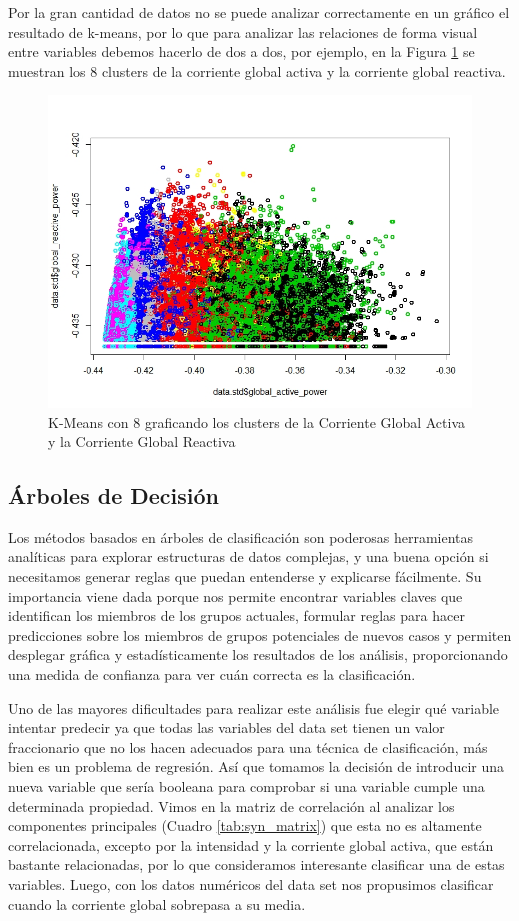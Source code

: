 \documentclass[a4paper,10pt,twocolumn]{report}
\begin{document}
	Por la gran cantidad de datos no se puede analizar correctamente en un gráfico el resultado de k-means, por lo que para analizar las relaciones de forma visual entre variables debemos hacerlo de dos a dos, por ejemplo, en la Figura \ref{fig:clusters_gap_grp} se muestran los 8 clusters de la corriente global activa y la corriente global reactiva.
	
	\begin{figure}[H]
		\centering
		\includegraphics[width=0.9\linewidth]{img/cluster/clusters_gap_grp}
		\caption{K-Means con 8 graficando los clusters de la Corriente Global Activa y la Corriente Global Reactiva}
		\label{fig:clusters_gap_grp}
	\end{figure}

	\subsection{Árboles de Decisión }
	
	Los métodos basados en árboles de clasificación son poderosas herramientas analíticas para explorar estructuras de datos complejas, y una buena opción si necesitamos generar reglas que puedan entenderse y explicarse fácilmente. Su importancia viene dada porque nos permite encontrar variables claves que identifican los miembros de los grupos actuales, formular reglas para hacer predicciones sobre los miembros de grupos potenciales de nuevos casos y permiten desplegar gráfica y estadísticamente los resultados de los análisis, proporcionando una medida de confianza para ver cuán correcta es la clasificación.
	
	Uno de las mayores dificultades para realizar este análisis fue elegir qué variable intentar predecir ya que todas las variables del data set tienen un valor fraccionario que no los hacen adecuados para una técnica de clasificación, más bien es un problema de regresión. Así que tomamos la decisión de introducir una nueva variable que sería booleana para comprobar si una variable cumple una determinada propiedad. Vimos en la matriz de correlación al analizar los componentes principales (Cuadro \ref{tab:syn_matrix}) que esta no es altamente correlacionada, excepto por la intensidad y la corriente global activa, que están bastante relacionadas, por lo que consideramos interesante clasificar una de estas variables. Luego, con los datos numéricos del data set nos propusimos clasificar cuando la corriente global sobrepasa a su media.
	
\end{document}
